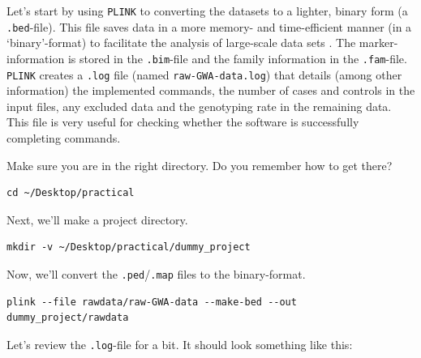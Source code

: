 \documentclass[
]{book}
\newcommand{\passthrough}[1]{#1}
\begin{document}
Let's start by using \passthrough{\lstinline!PLINK!} to converting the datasets to a lighter, binary form (a \passthrough{\lstinline!.bed!}-file). This file saves data in a more memory- and time-efficient manner (in a `binary'-format) to facilitate the analysis of large-scale data sets \citep{purcell2007}. The marker-information is stored in the \passthrough{\lstinline!.bim!}-file and the family information in the \passthrough{\lstinline!.fam!}-file. \passthrough{\lstinline!PLINK!} creates a \passthrough{\lstinline!.log!} file (named \passthrough{\lstinline!raw-GWA-data.log!}) that details (among other information) the implemented commands, the number of cases and controls in the input files, any excluded data and the genotyping rate in the remaining data. This file is very useful for checking whether the software is successfully completing commands.

Make sure you are in the right directory. Do you remember how to get there?

\begin{lstlisting}
cd ~/Desktop/practical
\end{lstlisting}

Next, we'll make a project directory.

\begin{lstlisting}
mkdir -v ~/Desktop/practical/dummy_project
\end{lstlisting}

Now, we'll convert the \passthrough{\lstinline!.ped!}/\passthrough{\lstinline!.map!} files to the binary-format.

\begin{lstlisting}
plink --file rawdata/raw-GWA-data --make-bed --out dummy_project/rawdata
\end{lstlisting}

Let's review the \passthrough{\lstinline!.log!}-file for a bit. It should look something like this:
\end{document}
